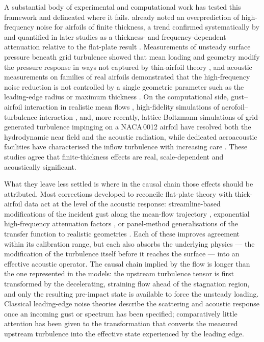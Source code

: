 \documentclass[lineno]{JFM-FLM_Au}
\begin{document}
A substantial body of experimental and computational work has tested this
framework and delineated where it fails. \citet{PatersonAmiet1976} already
noted an overprediction of high-frequency noise for airfoils of finite
thickness, a trend confirmed systematically by \citet{OlsenWagner1982} and
quantified in later studies as a thickness- and frequency-dependent
attenuation relative to the flat-plate result
\citep{Gershfeld2004,Lysak2013,Gill2013}. Measurements of unsteady surface
pressure beneath grid turbulence showed that mean loading and geometry
modify the pressure response in ways not captured by thin-airfoil theory
\citep{MishDevenport2006}, and acoustic measurements on families of real
airfoils demonstrated that the high-frequency noise reduction is not
controlled by a single geometric parameter such as the leading-edge radius or
maximum thickness \citep{DevenportStaubsGlegg2010,Hall2011}. On the
computational side, gust--airfoil interaction in realistic mean flows
\citep{LockardMorris1998}, high-fidelity simulations of
aerofoil--turbulence interaction \citep{KimHaeriJoseph2016}, and, more
recently, lattice Boltzmann simulations of grid-generated turbulence
impinging on a NACA\,0012 airfoil
\citep{Trascinelli2023,Piccolo2024} have resolved both the hydrodynamic
near field and the acoustic radiation, while dedicated aeroacoustic
facilities have characterised the inflow turbulence with increasing care
\citep{Bowen2022}. These studies agree that finite-thickness effects are
real, scale-dependent and acoustically significant.

What they leave less settled is where in the causal chain those effects
should be attributed. Most corrections developed to reconcile flat-plate
theory with thick-airfoil data act at the level of the acoustic response:
streamline-based modifications of the incident gust along the mean-flow
trajectory \citep{Guidati1997,Moriarty2005}, exponential high-frequency
attenuation factors \citep{Gershfeld2004,Lysak2013}, or panel-method
generalisations of the transfer function to realistic geometries
\citep{GleggDevenport2010Panel}. Each of these improves agreement within its
calibration range, but each also absorbs the underlying physics — the
modification of the turbulence itself before it reaches the surface — into
an effective acoustic operator. The causal chain implied by the flow is
longer than the one represented in the models: the upstream turbulence
tensor is first transformed by the decelerating, straining flow ahead of the
stagnation region, and only the resulting pre-impact state is available to
force the unsteady loading. Classical leading-edge noise theories describe
the scattering and acoustic response once an incoming gust or spectrum has
been specified; comparatively little attention has been given to the
transformation that converts the measured upstream turbulence into the
effective state experienced by the leading edge.
\end{document}
